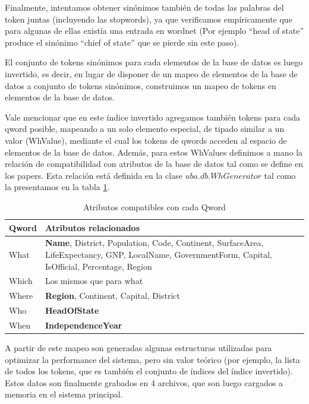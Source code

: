 Finalmente, intentamos obtener sinónimos también de todas las palabras del token juntas (incluyendo las stopwords), ya que verificamos empíricamente que para algunas de ellas existía una entrada en wordnet (Por ejemplo ``head of state'' produce el sinónimo ``chief of state'' que se pierde sin este paso).

El conjunto de tokens sinónimos para cada elementos de la base de datos es luego invertido, es decir, en lugar de disponer de un mapeo de elementos de la base de datos a conjunto de tokens sinónimos, construimos un mapeo de tokens en elementos de la base de datos.

Vale mencionar que en este índice invertido agregamos también tokens para cada qword posible, mapeando a un solo elemento especial, de tipado similar a un valor (WhValue), mediante el cual los tokens de qwords acceden al espacio de elementos de la base de datos. Además, para estos WhValues definimos a mano la relación de compatibilidad con atributos de la base de datos tal como se define en los papers. Esta relación está definida en la clase $uba.db.WhGenerator$ tal como la presentamos en la tabla \ref{table:atributos-qwords}.

\begin{center}
\begin{table}[h]
\centering
\begin{tabular}{| l |  p{12cm} |}
\hline
Qword & Atributos relacionados \\ \hline
What & \textbf{Name}, District, Population, Code, Continent, SurfaceArea, LifeExpectancy, GNP, LocalName, GovernmentForm,
                         Capital, IsOfficial, Percentage, Region \\ \hline
Which & Los mismos que para what\\ \hline
Where & \textbf{Region}, Continent, Capital, District\\ \hline
Who & \textbf{HeadOfState}\\ \hline
When & \textbf{IndependenceYear}\\ \hline
\end{tabular}
\caption{Atributos compatibles con cada Qword}
\label{table:atributos-qwords}
\end{table}
\end{center}

A partir de este mapeo son generadas algunas estructuras utilizadas para optimizar la performance del sistema, pero sin valor teórico (por ejemplo, la lista de todos los tokens, que es también el conjunto de índices del índice invertido). Estos datos son finalmente grabados en 4 archivos, que son luego cargados a memoria en el sistema principal.

